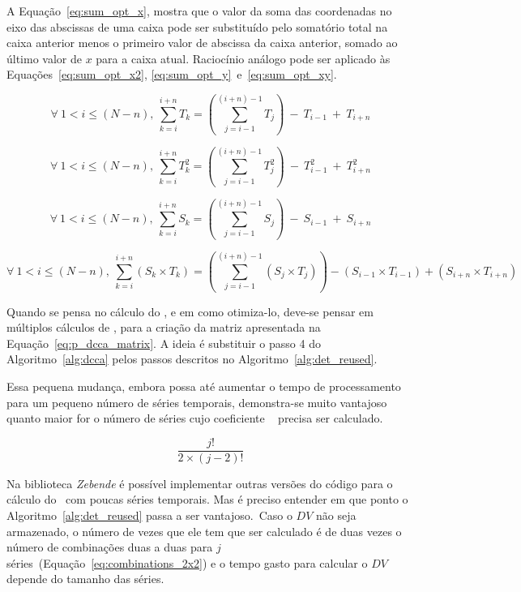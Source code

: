A Equação~\ref{eq:sum_opt_x}, mostra que o valor da soma das coordenadas no eixo das abscissas de uma caixa pode ser substituído pelo somatório total na caixa anterior menos o primeiro valor de abscissa da caixa anterior, somado ao último valor de $x$ para a caixa atual. Raciocínio análogo pode ser aplicado às Equações~\ref{eq:sum_opt_x2}, \ref{eq:sum_opt_y}~e~\ref{eq:sum_opt_xy}.

\begin{equation}
    \label{eq:sum_opt_x}
    \forall~1<i\leq(N-n),~\sum_{k=i}^{i + n}T_k = \left(\sum_{j=i-1}^{(i+n)-1}T_j\right)~-~T_{i-1}~+~T_{i + n}
  \end{equation}
  
  \begin{equation}
    \label{eq:sum_opt_x2}
    \forall~1<i\leq(N-n),~\sum_{k=i}^{i + n}T_k^2 = \left(\sum_{j=i-1}^{(i+n)-1}T_j^2\right)~-~T_{i-1}^2~+~T_{i + n}^2
  \end{equation}
  
  \begin{equation}
    \label{eq:sum_opt_y}
    \forall~1<i\leq(N-n),~\sum_{k=i}^{i + n}S_k = \left(\sum_{j=i-1}^{(i+n)-1}S_j\right)~-~S_{i-1}~+~S_{i + n}
  \end{equation}
  
  \begin{equation}
    \label{eq:sum_opt_xy}
    \forall~1<i\leq(N-n),~\sum_{k=i}^{i + n} (S_k\times T_k) = \left(\sum_{j=i-1}^{(i+n)-1}(S_j \times T_j)\right)-(S_{i-1} \times T_{i-1})+(S_{i + n} \times T_{i + n})
  \end{equation}

Quando se pensa no cálculo do \dmc, e em como otimiza-lo, deve-se pensar em múltiplos cálculos de \pdcca, para a criação da matriz apresentada na Equação~\ref{eq:p_dcca_matrix}. A ideia é substituir o passo 4 do Algoritmo~\ref{alg:dcca} pelos passos descritos no Algoritmo~\ref{alg:det_reused}.



Essa pequena mudança, embora possa até aumentar o tempo de processamento para um pequeno número de séries temporais, demonstra-se muito vantajoso quanto maior for o número de séries cujo coeficiente \pdcca~ precisa ser calculado.

\begin{equation}\label{eq:combinations_2x2}
  \frac{j!}{2 \times (j-2)!}
\end{equation}

Na biblioteca \emph{Zebende} é possível implementar outras versões do código para o cálculo do \pdcca~com poucas séries temporais. Mas é preciso entender em que ponto o Algoritmo~\ref{alg:det_reused} passa a ser vantajoso.~Caso o $DV$ não seja armazenado, o número de vezes que ele tem que ser calculado é de duas vezes o número de combinações duas a duas para $j$ séries~(Equação~\ref{eq:combinations_2x2}) e o tempo gasto para calcular o $DV$ depende do tamanho das séries.


